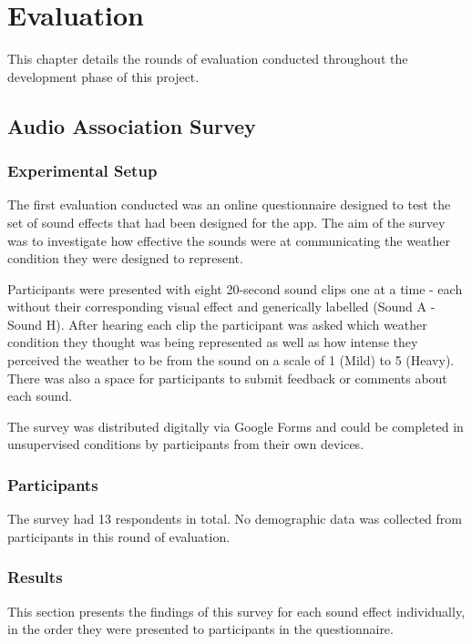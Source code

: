 \documentclass{l4proj}
\begin{document}
\chapter{Evaluation} 

This chapter details the rounds of evaluation conducted throughout the development phase of this project.

\section{Audio Association Survey} \label{sec:audio_survey}
\subsection{Experimental Setup}
The first evaluation conducted was an online questionnaire designed to test the set of sound effects that had been designed for the app. The aim of the survey was to investigate how effective the sounds were at communicating the weather condition they were designed to represent.

Participants were presented with eight 20-second sound clips one at a time - each without their corresponding visual effect and generically labelled (Sound A - Sound H). After hearing each clip the participant was asked which weather condition they thought was being represented as well as how intense they perceived the weather to be from the sound on a scale of 1 (Mild) to 5 (Heavy). There was also a space for participants to submit feedback or comments about each sound.

The survey was distributed digitally via Google Forms and could be completed in unsupervised conditions by participants from their own devices.

\subsection{Participants}

The survey had 13 respondents in total. No demographic data was collected from participants in this round of evaluation.

\subsection{Results}

This section presents the findings of this survey for each sound effect individually, in the order they were presented to participants in the questionnaire.
\end{document}
